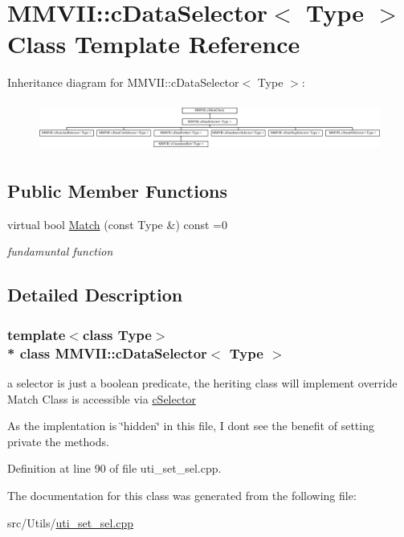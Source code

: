 \hypertarget{classMMVII_1_1cDataSelector}{}\section{M\+M\+V\+II\+:\+:c\+Data\+Selector$<$ Type $>$ Class Template Reference}
\label{classMMVII_1_1cDataSelector}
Inheritance diagram for M\+M\+V\+II\+:\+:c\+Data\+Selector$<$ Type $>$\+:\begin{figure}[H]
\begin{center}
\leavevmode
\includegraphics[height=1.644640cm]{classMMVII_1_1cDataSelector}
\end{center}
\end{figure}
\subsection*{Public Member Functions}
\begin{DoxyCompactItemize}
\item 
virtual bool \hyperlink{classMMVII_1_1cDataSelector_a9ae1883714aef1f63b6d0c156be44e0c}{Match} (const Type \&) const =0\hypertarget{classMMVII_1_1cDataSelector_a9ae1883714aef1f63b6d0c156be44e0c}{}\label{classMMVII_1_1cDataSelector_a9ae1883714aef1f63b6d0c156be44e0c}

\begin{DoxyCompactList}\small\item\em fundamuntal function \end{DoxyCompactList}\end{DoxyCompactItemize}


\subsection{Detailed Description}
\subsubsection*{template$<$class Type$>$\\*
class M\+M\+V\+I\+I\+::c\+Data\+Selector$<$ Type $>$}

a selector is just a boolean predicate, the heriting class will implement override Match Class is accessible via \hyperlink{classMMVII_1_1cSelector}{c\+Selector}

As the implentation is \char`\"{}hidden\char`\"{} in this file, I dont see the benefit of setting private the methods. 

Definition at line 90 of file uti\+\_\+set\+\_\+sel.\+cpp.



The documentation for this class was generated from the following file\+:\begin{DoxyCompactItemize}
\item 
src/\+Utils/\hyperlink{uti__set__sel_8cpp}{uti\+\_\+set\+\_\+sel.\+cpp}\end{DoxyCompactItemize}
